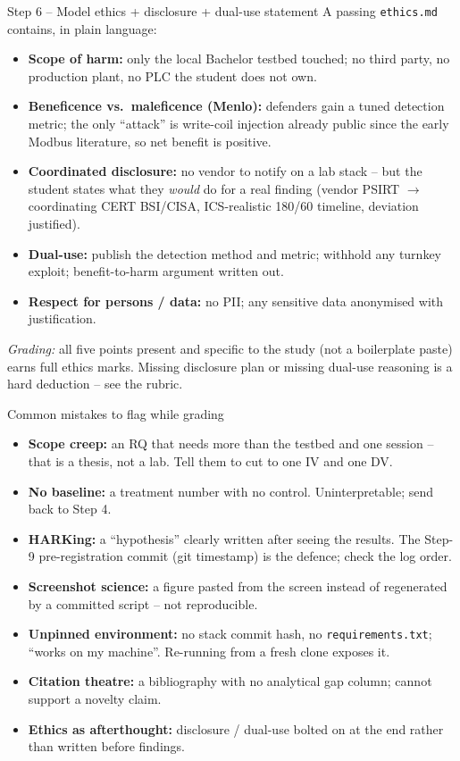 \documentclass[11pt,a4paper]{article}
\begin{document}
\begin{solutionbox}{Step 6 -- Model ethics + disclosure + dual-use statement}
A passing \texttt{ethics.md} contains, in plain language:
\begin{itemize}\setlength{\itemsep}{1pt}
  \item \textbf{Scope of harm:} only the local Bachelor testbed touched; no third party, no production plant, no PLC the student does not own.
  \item \textbf{Beneficence vs.\ maleficence (Menlo):} defenders gain a tuned detection metric; the only ``attack'' is write-coil injection already public since the early Modbus literature, so net benefit is positive.
  \item \textbf{Coordinated disclosure:} no vendor to notify on a lab stack -- but the student states what they \emph{would} do for a real finding (vendor PSIRT $\to$ coordinating CERT BSI/CISA, ICS-realistic 180/60 timeline, deviation justified).
  \item \textbf{Dual-use:} publish the detection method and metric; withhold any turnkey exploit; benefit-to-harm argument written out.
  \item \textbf{Respect for persons / data:} no PII; any sensitive data anonymised with justification.
\end{itemize}
\emph{Grading:} all five points present and specific to the study (not a
boilerplate paste) earns full ethics marks. Missing disclosure plan or
missing dual-use reasoning is a hard deduction -- see the rubric.
\end{solutionbox}

\begin{solutionbox}{Common mistakes to flag while grading}
\begin{itemize}\setlength{\itemsep}{1pt}
  \item \textbf{Scope creep:} an RQ that needs more than the testbed and one session -- that is a thesis, not a lab. Tell them to cut to one IV and one DV.
  \item \textbf{No baseline:} a treatment number with no control. Uninterpretable; send back to Step 4.
  \item \textbf{HARKing:} a ``hypothesis'' clearly written after seeing the results. The Step-9 pre-registration commit (git timestamp) is the defence; check the log order.
  \item \textbf{Screenshot science:} a figure pasted from the screen instead of regenerated by a committed script -- not reproducible.
  \item \textbf{Unpinned environment:} no stack commit hash, no \texttt{requirements.txt}; ``works on my machine''. Re-running from a fresh clone exposes it.
  \item \textbf{Citation theatre:} a bibliography with no analytical gap column; cannot support a novelty claim.
  \item \textbf{Ethics as afterthought:} disclosure / dual-use bolted on at the end rather than written before findings.
\end{itemize}
\end{solutionbox}
\end{document}
